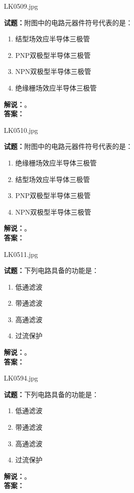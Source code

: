 \documentclass{ctexbook}
\begin{document}
\bigskip

LK0509.jpg


\noindent\textbf{试题：}附图中的电路元器件符号代表的是：
\begin{enumerate}[leftmargin=3em]
\item 结型场效应半导体三极管
\item PNP双极型半导体三极管
\item NPN双极型半导体三极管
\item 绝缘栅场效应半导体三极管
\end{enumerate}
\noindent\textbf{解说：}\textbf{}。\\\noindent\textbf{答案：}

\bigskip

LK0510.jpg


\noindent\textbf{试题：}附图中的电路元器件符号代表的是：
\begin{enumerate}[leftmargin=3em]
\item 绝缘栅场效应半导体三极管
\item 结型场效应半导体三极管
\item PNP双极型半导体三极管
\item NPN双极型半导体三极管
\end{enumerate}
\noindent\textbf{解说：}\textbf{}。\\\noindent\textbf{答案：}

\bigskip

LK0511.jpg


\noindent\textbf{试题：}下列电路具备的功能是：
\begin{enumerate}[leftmargin=3em]
\item 低通滤波
\item 带通滤波
\item 高通滤波
\item 过流保护
\end{enumerate}
\noindent\textbf{解说：}\textbf{}。\\\noindent\textbf{答案：}

\bigskip

LK0594.jpg


\noindent\textbf{试题：}下列电路具备的功能是：
\begin{enumerate}[leftmargin=3em]
\item 低通滤波
\item 带通滤波
\item 高通滤波
\item 过流保护
\end{enumerate}
\noindent\textbf{解说：}\textbf{}。\\\noindent\textbf{答案：}
\end{document}
